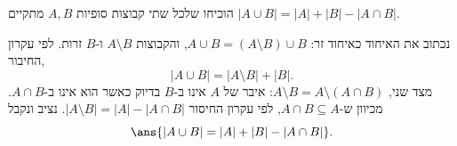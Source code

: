 הוכיחו שלכל שתי קבוצות סופיות $A,B$ מתקיים $|A\cup B|=|A|+|B|-|A\cap B|$.
\begin{solbox}
נכתוב את האיחוד כאיחוד זר: $A\cup B=(A\setminus B)\cup B$, והקבוצות $A\setminus B$ ו-$B$ זרות. לפי עקרון החיבור,
\[
|A\cup B|=|A\setminus B|+|B|.
\]
מצד שני, $A\setminus B=A\setminus(A\cap B)$: איבר של $A$ אינו ב-$B$ בדיוק כאשר הוא אינו ב-$A\cap B$. מכיוון ש-$A\cap B\subseteq A$, לפי עקרון החיסור $|A\setminus B|=|A|-|A\cap B|$. נציב ונקבל
\[
\ans{|A\cup B|=|A|+|B|-|A\cap B|}.
\]
\end{solbox}
